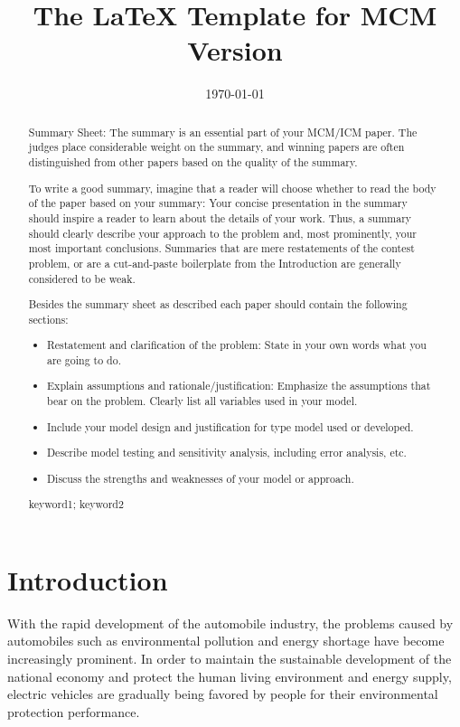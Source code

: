 \documentclass{mcmthesis}
\title{The \LaTeX{} Template for MCM Version \MCMversion}
\date{\today}
\begin{document}
\begin{abstract}

Summary Sheet: The summary is an essential part of your MCM/ICM paper. 
The judges place considerable weight on the summary, 
and winning papers are often distinguished from other papers based on the quality of the summary.

To write a good summary, imagine that a reader will choose whether to read the body of the paper based on your summary: 
Your concise presentation in the summary should inspire a reader to learn about the details of your work. 
Thus, a summary should clearly describe your approach to the problem and, most prominently, your most important conclusions.  
Summaries that are mere restatements of the contest problem, or are a cut-and-paste boilerplate from the Introduction are generally considered to be weak.

Besides the summary sheet as described each paper should contain the following sections:

\begin{itemize}
\item Restatement and clarification of the problem: State in your own words what you are going to do.
\item Explain assumptions and rationale/justification: Emphasize the assumptions that bear on the problem. Clearly list all variables used in your model.
\item Include your model design and justification for type model used or developed.
\item Describe model testing and sensitivity analysis, including error analysis, etc.
\item Discuss the strengths and weaknesses of your model or approach.
\end{itemize}

\begin{keywords}
keyword1; keyword2
\end{keywords}

\end{abstract}
\maketitle
\section{Introduction}
With the rapid development of the automobile industry, the problems caused by automobiles such as environmental pollution and energy shortage have become increasingly prominent. In order to maintain the sustainable development of the national economy and protect the human living environment and energy supply, electric vehicles are gradually being favored by people for their environmental protection performance.
   
\end{document}
